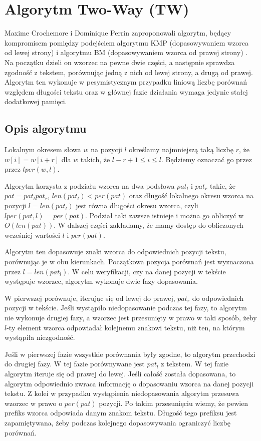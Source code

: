\newpage
\section{Algorytm Two-Way (TW)}
Maxime Crochemore i Dominique Perrin zaproponowali algorytm, będący kompromisem pomiędzy podejściem algorytmu KMP (dopasowywaniem wzorca od lewej strony) i algorytmu BM (dopasowywaniem wzorca od prawej strony) \cite{TW}. Na początku dzieli on wzorzec na pewne dwie części, a następnie sprawdza zgodność z tekstem, porównując jedną z nich od lewej strony, a drugą od prawej. Algorytm ten wykonuje w pesymistycznym przypadku liniową liczbę porównań względem długości tekstu oraz w głównej fazie działania wymaga jedynie stałej dodatkowej pamięci.

\subsection{Opis algorytmu}
\begin{definition}
Lokalnym okresem słowa $w$ na pozycji $l$ określamy najmniejszą taką liczbę $r$, że $w[i]=w[i+r]$ dla $w$ takich, że $l-r+1 \leq i \leq l$. Będziemy oznaczać go przez przez $lper(w,l)$. 
\end{definition}

Algorytm korzysta z podziału wzorca na dwa podsłowa $pat_{l}$ i $pat_{r}$ takie, że $pat = pat_{l}pat_{r}$, $len(pat_{l}) < per(pat)$ oraz długość lokalnego okresu wzorca na pozycji $l = len(pat_{l})$ jest równa długości okresu wzorca, czyli $lper(pat, l) = per(pat)$. Podział taki zawsze istnieje i można go obliczyć w $O(len(pat))$. W dalszej części zakładamy, że mamy dostęp do obliczonych wcześniej wartości $l$ i $per(pat)$.

Algorytm ten dopasowuje znaki wzorca do odpowiednich pozycji tekstu, porównując je w obu kierunkach. Początkowa pozycja porównań jest wyznaczona przez $l = len(pat_{l})$. W celu weryfikacji, czy na danej pozycji w tekście występuje wzorzec, algorytm wykonuje dwie fazy dopasowania. 

W pierwszej porównuje, iterując się od lewej do prawej, $pat_{r}$ do odpowiednich pozycji w tekście. Jeśli wystąpiło niedopasowanie podczas tej fazy, to algorytm nie wykonuje drugiej fazy, a wzorzec jest przesunięty w prawo w taki sposób, żeby $l$-ty element wzorca odpowiadał kolejnemu znakowi tekstu, niż ten, na którym wystąpiła niezgodność.

Jeśli w pierwszej fazie wszystkie porównania były zgodne, to algorytm przechodzi do drugiej fazy. W tej fazie porównywane jest $pat_{l}$ z tekstem. W tej fazie algorytm iteruje się od prawej do lewej. Jeśli całość została dopasowana, to algorytm odpowiednio zwraca informację o dopasowaniu wzorca na danej pozycji tekstu. Z kolei w przypadku wystąpienia niedopasowania algorytm przesuwa wzorzec w prawo o $per(pat)$ pozycji. Po takim przesunięciu wiemy, że pewien prefiks wzorca odpowiada danym znakom tekstu. Długość tego prefiksu jest zapamiętywana, żeby podczas kolejnego dopasowywania ograniczyć liczbę porównań.

